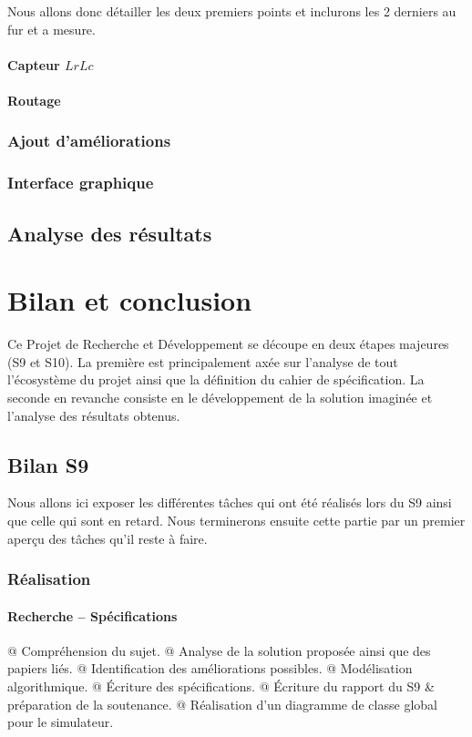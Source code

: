 \documentclass[final]{polytech/polytech}
\begin{document}
			Nous allons donc détailler les deux premiers points et inclurons les 2 derniers au fur et a mesure.
			
			\subsubsection{Capteur $LrLc$}
				
				
			\subsubsection{Routage}
				
				
		\subsection{Ajout d'améliorations}
		\subsection{Interface graphique}
	
	\section{Analyse des résultats}
	
\chapter{Bilan et conclusion}
	Ce Projet de Recherche et Développement se découpe en deux étapes majeures (S9 et S10).
	La première est principalement axée sur l'analyse de tout l'écosystème du projet ainsi que la définition du cahier de spécification.
	La seconde en revanche consiste en le développement de la solution imaginée et l'analyse des résultats obtenus.
	
	\section{Bilan S9}
		Nous allons ici exposer les différentes tâches qui ont été réalisés lors du S9 ainsi que celle qui sont en retard.
		Nous terminerons ensuite cette partie par un premier aperçu des tâches qu'il reste à faire.
		
		\subsection{Réalisation}
			\subsubsection{Recherche -- Spécifications}
				\begin{easylist}[itemize]
					@ Compréhension du sujet.
					@ Analyse de la solution proposée ainsi que des papiers liés.
					@ Identification des améliorations possibles.
					@ Modélisation algorithmique.
					@ Écriture des spécifications.
					@ Écriture du rapport du S9 \& préparation de la soutenance.
					@ Réalisation d'un diagramme de classe global pour le simulateur.
				\end{easylist}
\end{document}
